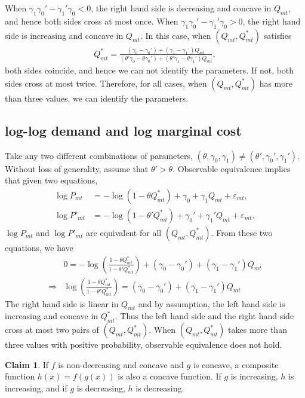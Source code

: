 \documentclass[11pt]{article}
\numberwithin{figure}{section}
\theoremstyle{definition}
\newcommand{\0}{\mathbf{0}}
\newtheorem{claim}{Claim}
\begin{document}
When $\gamma_1\gamma_0' - \gamma_1' \gamma_0 < 0$, the right hand side is decreasing and concave in $Q_{mt}$, and hence both sides cross at most once.
When $\gamma_1\gamma_0' - \gamma_1' \gamma_0 >0$, the right hand side is increasing and concave in $Q_{mt}$.
In this case, when $(Q_{mt}, Q^*_{mt})$ satisfies
\begin{align*}
    Q^*_{mt} = \frac{(\gamma_0 - \gamma_0') + (\gamma_1 - \gamma_1')Q_{mt}}{(\theta'\gamma_0 - \theta\gamma_0') + (\theta'\gamma_1 - \theta\gamma_1')Q_{mt}},
\end{align*}
both sides coincide, and hence we can not identify the parameters. If not, both sides cross at most twice.
Therefore, for all cases, when $(Q_{mt}, Q^*_{mt})$ has more than three values, we can identify the parameters.

\subsection{log-log demand and log marginal cost}
    Take any two different combinations of parameters, $(\theta, \gamma_0, \gamma_1) \ne (\theta', \gamma_0', \gamma_1')$. Without loss of generality, assume that $\theta' > \theta$. Observable equivalence implies that given two equations,
    \begin{align}
        \log P_{mt} &= -\log \left(  1 - \theta Q^*_{mt} \right) +\gamma_0 + \gamma_1 Q_{mt} + \varepsilon_{mt},\\
        \log P'_{mt} &= -\log \left(  1 - \theta' Q^*_{mt} \right) +\gamma_0' + \gamma_1' Q_{mt} + \varepsilon_{mt},
    \end{align}
    $\log P_{mt}$ and $\log P'_{mt}$ are equivalent for all $(Q_{mt}, Q^*_{mt})$.
    From these two equations, we have
    \begin{align}
        &0  = -\log \left( \frac{ 1 - \theta Q^*_{mt}}{ 1 - \theta' Q^*_{mt}} \right) +(\gamma_0 -\gamma_0') + (\gamma_1 - \gamma_1') Q_{mt}\\
        \Longrightarrow & \log \left( \frac{ 1 - \theta Q^*_{mt}}{ 1 - \theta' Q^*_{mt}} \right)  = (\gamma_0 -\gamma_0') + (\gamma_1 - \gamma_1') Q_{mt}
    \end{align}
    The right hand side is linear in $Q_{mt}$ and by assumption, the left hand side is increasing and concave in $Q^*_{mt}$. Thus the left hand side and the right hand side cross at most two pairs of $(Q_{mt}, Q^*_{mt})$. When $(Q_{mt}, Q^*_{mt})$ takes more than three values with positive probability, observable equivalence does not hold.
    
    
\begin{claim}
    If $f$ is non-decreasing and concave and $g$ is concave, a composite function $h(x) = f(g(x))$ is also a concave function. If $g$ is increasing, $h$ is increasing, and if $g$ is decreasing, $h$ is decreasing.
\end{claim}
    
    
    



\end{document}
